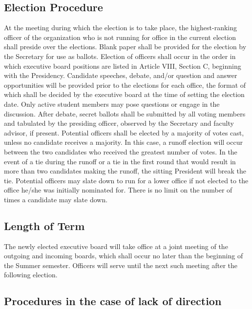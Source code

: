 \documentclass{article}
\begin{document}
\subsection{Election Procedure}

At the meeting during which the election is to take place, the highest-ranking officer of the organization who is not running for office in the current election shall preside over the elections. Blank paper shall be provided for the election by the Secretary for use as ballots.
Election of officers shall occur in the order in which executive board positions are listed in Article VIII, Section C, beginning with the Presidency. Candidate speeches, debate, and/or question and answer opportunities will be provided prior to the elections for each office, the format of which shall be decided by the executive board at the time of setting the election date. Only active student members may pose questions or engage in the discussion.
After debate, secret ballots shall be submitted by all voting members and tabulated by the presiding officer, observed by the Secretary and faculty advisor, if present. Potential officers shall be elected by a majority of votes cast, unless no candidate receives a majority. In this case, a runoff election will occur between the two candidates who received the greatest number of votes. In the event of a tie during the runoff or a tie in the first round that would result in more than two candidates making the runoff, the sitting President will break the tie. Potential officers may slate down to run for a lower office if not elected to the office he/she was initially nominated for. There is no limit on the number of times a candidate may slate down.


\subsection{Length of Term}

The newly elected executive board will take office at a joint meeting of the outgoing and incoming boards, which shall occur no later than the beginning of the Summer semester. Officers will serve until the next such meeting after the following election.


\subsection{Procedures in the case of lack of direction}
\end{document}
